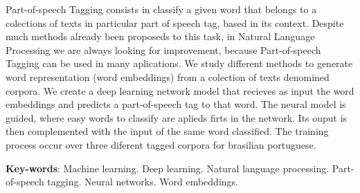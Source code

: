 \begin{resumo}[Abstract]
 
Part-of-speech Tagging consists in classify a given word that belongs to a colections of texts in particular part of speech tag, based in its context. Despite much methods already been proposeds to this task, in Natural Language Processing we are always looking for improvement, because Part-of-speech Tagging can be used in many aplications. We study different methods to generate word representation (word embeddings) from a colection of texts denomined corpora. We create a deep learning network model that recieves as input the word embeddings and predicts a part-of-speech tag to that word. The neural model is guided, where easy words to classify are aplieds firts in the network. Its ouput is then complemented with the input of the same word classified. The training process occur over three diferent tagged corpora for brasilian portuguese.

 \vspace{\onelineskip}
 
 \noindent 
 \textbf{Key-words}: Machine learning. Deep learning. Natural language processing. Part-of-speech tagging. Neural networks. Word embeddings.
\end{resumo}
